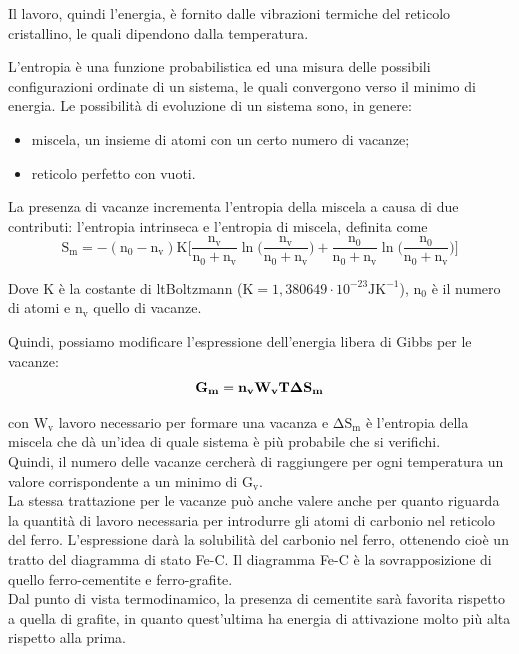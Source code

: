 Il lavoro, quindi l’energia, è fornito dalle vibrazioni termiche del reticolo cristallino, le quali dipendono dalla temperatura.

L’entropia è una funzione probabilistica ed una misura delle possibili configurazioni ordinate di un sistema, le quali convergono verso il minimo di energia. Le possibilità di evoluzione di un sistema sono, in genere:
\begin{itemize}
    \item miscela, un insieme di atomi con un certo numero di vacanze;
    \item reticolo perfetto con vuoti.
\end{itemize}


La presenza di vacanze incrementa l’entropia della miscela a causa di due contributi: l’entropia intrinseca e l’entropia di miscela, definita come
\begin{equation*}
    \mathrm{S_m=-(n_0-n_v)K\Big[\frac{n_v}{n_0+n_v}\ln{\Big(\frac{n_v}{n_0+n_v}\Big)}+\frac{n_0}{n_0+n_v}\ln{\Big(\frac{n_0}{n_0+n_v}\Big)}}\Big]
\end{equation*}

Dove K è la costante di ltBoltzmann ($\mathrm{K = 1,380649\cdot 10^{-23}JK^{-1}}$), $\mathrm{n_0}$ è il numero di atomi e $\mathrm{n_v}$ quello di vacanze.

Quindi, possiamo modificare l’espressione dell’energia libera di Gibbs per le vacanze:
\begin{equation*}
    \mathrm{\bold{G_m=n_vW_vT\Delta S_m}}
\end{equation*}

con $\mathrm{W_v}$ lavoro necessario per formare una vacanza e $\mathrm{\Delta S_m}$ è l’entropia della miscela che dà un’idea di quale sistema è più probabile che si verifichi.\\
Quindi, il numero delle vacanze cercherà di raggiungere per ogni temperatura un valore corrispondente a un minimo di $\mathrm{G_v}$.\\
La stessa trattazione per le vacanze può anche valere anche per quanto riguarda la quantità di lavoro necessaria per introdurre gli atomi di carbonio nel reticolo del ferro. L'espressione darà la solubilità del carbonio nel ferro, ottenendo cioè un tratto del diagramma di stato Fe-C. Il diagramma Fe-C è la sovrapposizione di quello ferro-cementite e ferro-grafite.\\
Dal punto di vista termodinamico, la presenza di cementite sarà favorita rispetto a quella di grafite, in quanto quest’ultima ha energia di attivazione molto più alta rispetto alla prima.

